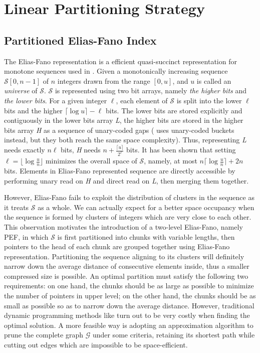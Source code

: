 \documentclass[runningheads,a4paper]{llncs}
\begin{document}
\section{Linear Partitioning Strategy}\label{sec:IIII}
\subsection{Partitioned Elias-Fano Index}

The Elias-Fano representation is a efficient quasi-succinct representation for monotone sequences used in \cite{elias1974efficient,vigna2013quasi}.
Given a monotonically increasing sequence $ \mathcal{S}[0,n-1] $ of $ n $ integers drawn from the range $ [0,u] $, and $ u $ is called an \textit{universe} of $ \mathcal{S} $.
$ \mathcal{S} $ is represented using two bit arrays, namely \textit{the higher bits} and \textit{the lower bits}.
For a given integer $ \ell $, each element of $ \mathcal{S} $ is split into the lower $ \ell $ bits and the higher $ \lceil \log u \rceil - \ell$ bits.
The lower bits are stored explicitly and contiguously in the lower bits array \textit{L}, the higher bits are stored in the higher bits array \textit{H} as a sequence of unary-coded gaps (\cite{ottaviano2014partitioned} uses unary-coded buckets instead, but they both reach the same space complexity).
Thus, representing \textit{L} needs exactly $ n\ell $ bits, \textit{H} needs $ n + \frac{\lceil u \rceil}{2^{\ell}} $ bits. It has been shown that setting $ \ell = \lfloor \log \frac{u}{n} \rfloor $ minimizes the overall space of $ \mathcal{S} $, namely, at most $ n \lceil \log \frac{u}{n} \rceil + 2 n $ bits. Elements in Elias-Fano represented sequence are directly accessible by performing unary read on \textit{H} and direct read on \textit{L}, then merging them together.

However, Elias-Fano fails to exploit the distribution of clusters in the sequence as it treats $ \mathcal{S} $ as a whole.
We can actually expect for a better space occupancy when the sequence is formed by clusters of integers which are very close to each other.
This observation motivates the introduction of a two-level Elias-Fano, namely PEF, in which $ \mathcal{S} $ is first partitioned into chunks with variable lengths, then pointers to the head of each chunk are grouped together using Elias-Fano representation.
Partitioning the sequence aligning to its clusters will definitely narrow down the average distance of consecutive elements inside, thus a smaller compressed size is possible.
An optimal partition must satisfy the following two requirements: on one hand, the chunks should be as large as possible to minimize the number of pointers in upper level; on the other hand, the chunks should be as small as possible so as to narrow down the average distance.
However, traditional dynamic programming methods like \cite{silvestri2010vsencoding} turn out to be very costly when finding the optimal solution.
A more feasible way is adopting an approximation algorithm to prune the complete graph $ \mathcal{G} $ under some criteria, retaining its shortest path while cutting out edges which are impossible to be space-efficient.
\end{document}
